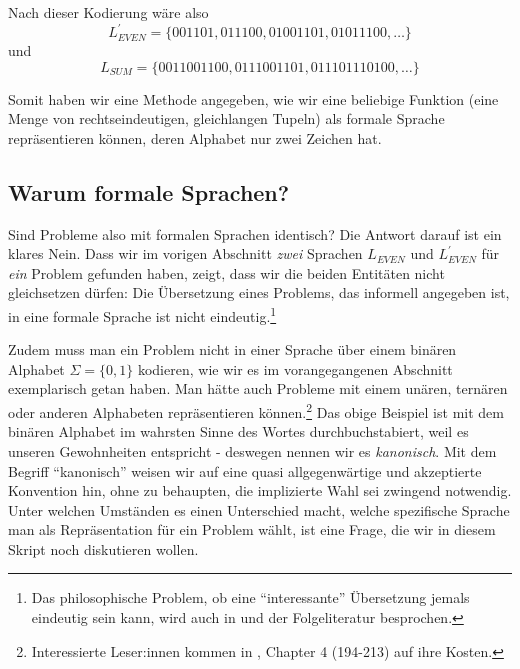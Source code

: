 Nach dieser Kodierung wäre also
\[
    L_{EVEN}^{'} = \{001101, 011100, 01001101, 01011100, \ldots \}
\]
und
\[
    L_{SUM} = \{0011001100, 0111001101, 011101110100, \ldots \}
\]

Somit haben wir eine Methode angegeben,
wie wir eine beliebige Funktion
(eine Menge von rechtseindeutigen, gleichlangen Tupeln)
als formale Sprache repräsentieren können,
deren Alphabet nur zwei Zeichen hat.


\subsection{Warum formale Sprachen?}\label{subsec:warumFormaleSprachen}

Sind Probleme also mit formalen Sprachen identisch?
Die Antwort darauf ist ein klares Nein.
Dass wir im vorigen Abschnitt \emph{zwei} Sprachen
$L_{EVEN}$ und $L_{EVEN}^{'}$ für \emph{ein} Problem gefunden haben,
zeigt, dass wir die beiden Entitäten nicht gleichsetzen dürfen:
Die Übersetzung eines Problems, das informell angegeben ist,
in eine formale Sprache ist nicht eindeutig.\footnote{
Das philosophische Problem, ob eine ``interessante'' Übersetzung jemals eindeutig sein kann,
wird auch in \cite{quine} und der Folgeliteratur besprochen.}

Zudem muss man ein Problem nicht in einer Sprache über einem binären Alphabet
$\Sigma = \{0,1\}$ kodieren,
wie wir es im vorangegangenen Abschnitt exemplarisch getan haben.
Man hätte auch Probleme mit einem unären, ternären
oder anderen Alphabeten repräsentieren können.\footnote{
    Interessierte Leser:innen kommen in \cite{knuth2}, Chapter 4 (194-213) auf ihre Kosten.
}
Das obige Beispiel ist mit dem binären Alphabet im wahrsten Sinne des Wortes durchbuchstabiert,
weil es unseren Gewohnheiten entspricht
- deswegen nennen wir es \emph{kanonisch}.
Mit dem Begriff ``kanonisch'' weisen wir
auf eine quasi allgegenwärtige und akzeptierte Konvention hin,
ohne zu behaupten, die implizierte Wahl sei zwingend notwendig.
Unter welchen Umständen es einen Unterschied macht,
welche spezifische Sprache man als Repräsentation für ein Problem wählt,
ist eine Frage,
die wir in diesem Skript noch diskutieren wollen.


